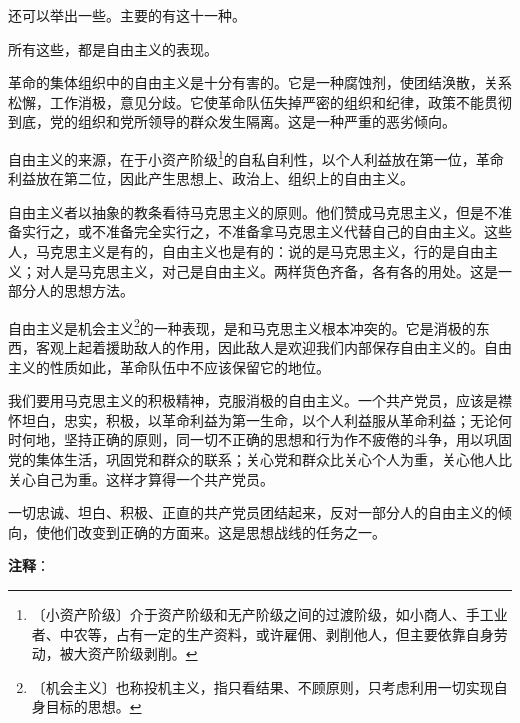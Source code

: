 \documentclass[12pt,UTF-8,openany]{ctexbook}
\begin{document}
\begin{large}
    还可以举出一些。主要的有这十一种。
    
    所有这些，都是自由主义的表现。
    
    革命的集体组织中的自由主义是十分有害的。它是一种腐蚀剂，使团结涣散，关系松懈，工作消极，意见分歧。它使革命队伍失掉严密的组织和纪律，政策不能贯彻到底，党的组织和党所领导的群众发生隔离。这是一种严重的恶劣倾向。
    
    自由主义的来源，在于小资产阶级\footnote{〔小资产阶级〕介于资产阶级和无产阶级之间的过渡阶级，如小商人、手工业者、中农等，占有一定的生产资料，或许雇佣、剥削他人，但主要依靠自身劳动，被大资产阶级剥削。}的自私自利性，以个人利益放在第一位，革命利益放在第二位，因此产生思想上、政治上、组织上的自由主义。
    
    自由主义者以抽象的教条看待马克思主义的原则。他们赞成马克思主义，但是不准备实行之，或不准备完全实行之，不准备拿马克思主义代替自己的自由主义。这些人，马克思主义是有的，自由主义也是有的：说的是马克思主义，行的是自由主义；对人是马克思主义，对己是自由主义。两样货色齐备，各有各的用处。这是一部分人的思想方法。
    
    自由主义是机会主义\footnote{〔机会主义〕也称投机主义，指只看结果、不顾原则，只考虑利用一切实现自身目标的思想。}的一种表现，是和马克思主义根本冲突的。它是消极的东西，客观上起着援助敌人的作用，因此敌人是欢迎我们内部保存自由主义的。自由主义的性质如此，革命队伍中不应该保留它的地位。
    
    我们要用马克思主义的积极精神，克服消极的自由主义。一个共产党员，应该是襟怀坦白，忠实，积极，以革命利益为第一生命，以个人利益服从革命利益；无论何时何地，坚持正确的原则，同一切不正确的思想和行为作不疲倦的斗争，用以巩固党的集体生活，巩固党和群众的联系；关心党和群众比关心个人为重，关心他人比关心自己为重。这样才算得一个共产党员。
    
    一切忠诚、坦白、积极、正直的共产党员团结起来，反对一部分人的自由主义的倾向，使他们改变到正确的方面来。这是思想战线的任务之一。
    
\end{large}


\newpage

\textbf{注释}：

\vspace{-1em}
\end{document}
